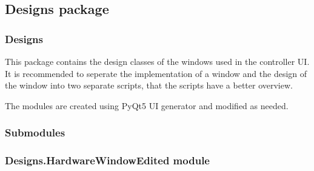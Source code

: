\documentclass[letterpaper,10pt,english]{sphinxmanual}
\begin{document}
\sphinxstepscope


\subsection{Designs package}
\label{\detokenize{NoSeMazeController/Designs:designs-package}}\label{\detokenize{NoSeMazeController/Designs::doc}}

\subsubsection{Designs}
\label{\detokenize{NoSeMazeController/Designs:designs}}
\sphinxAtStartPar
This package contains the design classes of the windows used in the controller UI. It is recommended to seperate the implementation of a window and the design of the window into two separate scripts, that the scripts have a better overview.

\sphinxAtStartPar
The modules are created using PyQt5 UI generator and modified as needed.


\subsubsection{Submodules}
\label{\detokenize{NoSeMazeController/Designs:submodules}}

\subsubsection{Designs.HardwareWindowEdited module}
\label{\detokenize{NoSeMazeController/Designs:module-Designs.HardwareWindowEdited}}\label{\detokenize{NoSeMazeController/Designs:designs-hardwarewindowedited-module}}
\end{document}
